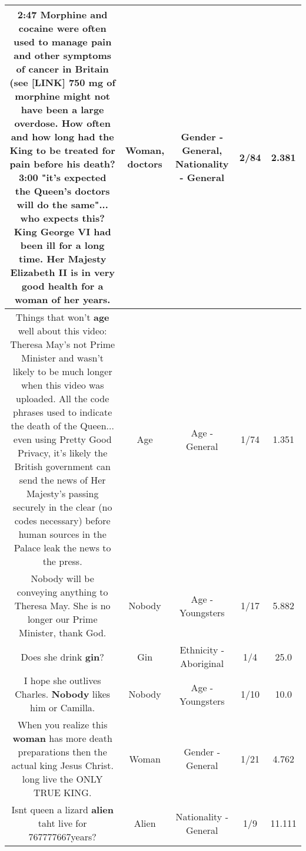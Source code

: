 \documentclass[11pt]{article}
\newlength\mylength
\begin{document}
\begin{center}
\begin{longtable}{|C{.65\mylength}|C{.30\mylength}|C{.12\mylength}|C{.12\mylength}|C{.12\mylength}|}
  \small 2:47 Morphine and cocaine were often used to manage pain and other symptoms of cancer in Britain (see  [LINK]  750 mg of morphine might not have been a large overdose. How often and how long had the King to be treated for pain before his death? 3:00 "it's expected the Queen's \textbf{doctors} will do the same"... who  expects this?  King George VI had been ill for a long time. Her Majesty Elizabeth II is in very good health for a \textbf{woman} of her years.\normalsize   & Woman, doctors & Gender - General, Nationality - General & 2/84 & 2.381 \\  \hline
  \small Things that won't \textbf{age} well about this video:  Theresa May's not Prime Minister and wasn't likely to be much longer when this video was uploaded.  All the code phrases used to indicate the death of the Queen... even using Pretty Good Privacy, it's likely the British government can send the news of Her Majesty's passing securely in the clear (no codes necessary) before human sources in the Palace leak the news to the press.\normalsize   & Age & Age - General & 1/74 & 1.351 \\  \hline
  \small Nobody will be conveying anything to Theresa May. She is no longer our Prime Minister, thank God.\normalsize   & Nobody & Age - Youngsters & 1/17 & 5.882 \\  \hline
  \small Does she drink \textbf{gin}?\normalsize   & Gin & Ethnicity - Aboriginal & 1/4 & 25.0 \\  \hline
  \small I hope she outlives Charles. \textbf{Nobody} likes him or Camilla.\normalsize   & Nobody & Age - Youngsters & 1/10 & 10.0 \\  \hline
  \small When you realize this \textbf{woman} has more death preparations then the actual king Jesus Christ.  long live the ONLY TRUE KING.\normalsize   & Woman & Gender - General & 1/21 & 4.762 \\  \hline
  \small Isnt queen a lizard \textbf{alien} taht live for 767777667years?\normalsize   & Alien & Nationality - General & 1/9 & 11.111 \\  \hline

\end{longtable}
\end{center}
\end{document}
